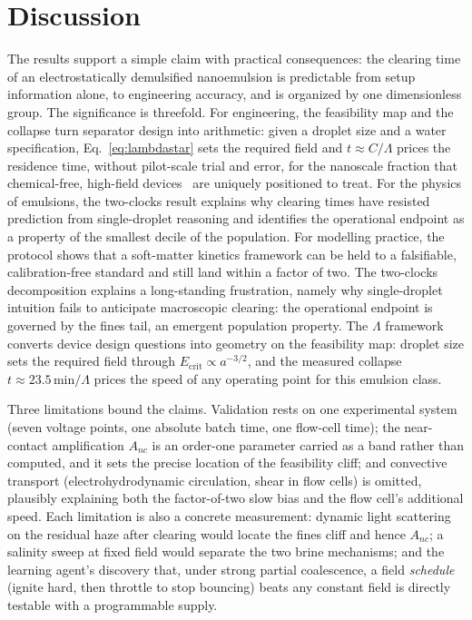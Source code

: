 \documentclass[aps,prfluids,reprint,amsmath,amssymb,superscriptaddress,longbibliography]{revtex4-2}
\begin{document}
\section{Discussion}

The results support a simple claim with practical consequences: the clearing
time of an electrostatically demulsified nanoemulsion is predictable from
setup information alone, to engineering accuracy, and is organized by one
dimensionless group. The significance is threefold. For engineering, the
feasibility map and the collapse turn separator design into arithmetic:
given a droplet size and a water specification, Eq.~\ref{eq:lambdastar}
sets the required field and $t\approx C/\Lambda$ prices the residence
time, without pilot-scale trial and error, for the nanoscale fraction that
chemical-free, high-field devices~\cite{panat2025} are uniquely positioned
to treat. For the physics of emulsions, the two-clocks result explains why
clearing times have resisted prediction from single-droplet reasoning and
identifies the operational endpoint as a property of the smallest decile of
the population. For modelling practice, the protocol shows that a
soft-matter kinetics framework can be held to a falsifiable,
calibration-free standard and still land within a factor of two. The two-clocks decomposition explains a long-standing
frustration, namely why single-droplet intuition fails to anticipate
macroscopic clearing: the operational endpoint is governed by the fines
tail, an emergent population property. The $\Lambda$ framework converts
device design questions into geometry on the feasibility map: droplet size
sets the required field through $E_{\mathrm{crit}}\!\propto\!a^{-3/2}$, and
the measured collapse $t\!\approx\!23.5\,\text{min}/\Lambda$ prices the
speed of any operating point for this emulsion class.

Three limitations bound the claims. Validation rests on one experimental
system (seven voltage points, one absolute batch time, one flow-cell time);
the near-contact amplification $A_{nc}$ is an order-one parameter carried as
a band rather than computed, and it sets the precise location of the
feasibility cliff; and convective transport (electrohydrodynamic
circulation, shear in flow cells) is omitted, plausibly explaining both the
factor-of-two slow bias and the flow cell's additional speed. Each
limitation is also a concrete measurement: dynamic light scattering on the
residual haze after clearing would locate the fines cliff and hence
$A_{nc}$; a salinity sweep at fixed field would separate the two brine
mechanisms; and the learning agent's discovery that, under strong partial
coalescence, a field \emph{schedule} (ignite hard, then throttle to stop
bouncing) beats any constant field is directly testable with a programmable
supply.
\end{document}
